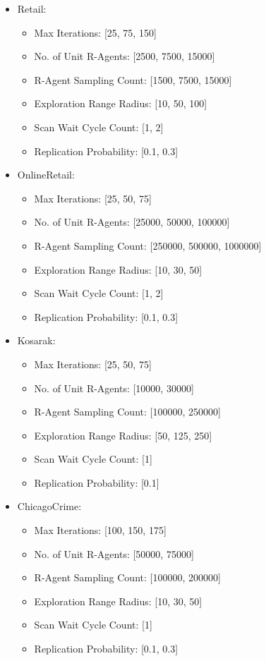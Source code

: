 \begin{itemize}
  \item Retail:
    \begin{itemize}
      \item Max Iterations: [25, 75, 150]
      \item No. of Unit R-Agents: [2500, 7500, 15000]
      \item R-Agent Sampling Count: [1500, 7500, 15000]
      \item Exploration Range Radius: [10, 50, 100]
      \item Scan Wait Cycle Count: [1, 2]
      \item Replication Probability: [0.1, 0.3]
    \end{itemize}
  \item OnlineRetail:
    \begin{itemize}
      \item Max Iterations: [25, 50, 75]
      \item No. of Unit R-Agents: [25000, 50000, 100000]
      \item R-Agent Sampling Count: [250000, 500000, 1000000]
      \item Exploration Range Radius: [10, 30, 50]
      \item Scan Wait Cycle Count: [1, 2]
      \item Replication Probability: [0.1, 0.3]
    \end{itemize}
  \item Kosarak:
    \begin{itemize}
      \item Max Iterations: [25, 50, 75]
      \item No. of Unit R-Agents: [10000, 30000]
      \item R-Agent Sampling Count: [100000, 250000]
      \item Exploration Range Radius: [50, 125, 250]
      \item Scan Wait Cycle Count: [1]
      \item Replication Probability: [0.1]
    \end{itemize}
  \item ChicagoCrime:
    \begin{itemize}
      \item Max Iterations: [100, 150, 175]
      \item No. of Unit R-Agents: [50000, 75000]
      \item R-Agent Sampling Count: [100000, 200000]
      \item Exploration Range Radius: [10, 30, 50]
      \item Scan Wait Cycle Count: [1]
      \item Replication Probability: [0.1, 0.3]
    \end{itemize}
\end{itemize}

